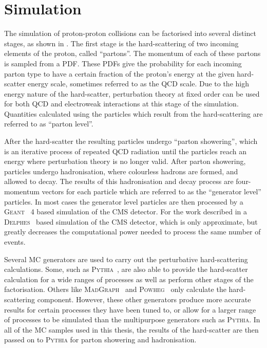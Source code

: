 \section{Simulation}
\label{sec:sim}
The simulation of \LHC proton-proton collisions can be factorised into several distinct stages, as shown in . The first stage is the hard-scattering of two incoming elements of the proton, called ``partons''. The momentum of each of these partons is sampled from a \ac{PDF}. These \ac{PDF}s give the probability for each incoming parton type to have a certain fraction of the proton's energy at the given hard-scatter energy scale, sometimes referred to as the \ac{QCD} scale. Due to the high energy nature of the hard-scatter, perturbation theory at fixed order can be used for both \ac{QCD} and electroweak interactions at this stage of the simulation. Quantities calculated using the particles which result from the hard-scattering are referred to as ``parton level''.

After the hard-scatter the resulting particles undergo ``parton showering'', which is an iterative process of repeated \ac{QCD} radiation until the particles reach an energy where perturbation theory is no longer valid. After parton showering, particles undergo hadronisation, where colourless hadrons are formed, and allowed to decay. The results of this hadronisation and decay process are four-momentum vectors for each particle which are referred to as the ``generator level'' particles. In most cases the generator level particles are then processed by a \textsc{Geant}~\cite{Agostinelli2003250} 4 based simulation of the CMS detector. For the work described in  a \textsc{Delphes}~\cite{Favereau2014} based simulation of the CMS detector, which is only approximate, but greatly decreases the computational power needed to process the same number of events.

Several \ac{MC} generators are used to carry out the perturbative hard-scattering calculations. Some, such as \textsc{Pythia}~\cite{Sjöstrand2008852}, are also able to provide the hard-scatter calculation for a wide ranges of processes as well as perform other stages of the factorisation. Others like \textsc{MadGraph}~\cite{Alwall2014} and \textsc{Powheg}~\cite{Nason:2004rx,Frixione:2007vw,Alioli:2010xd} only calculate the hard-scattering component. However, these other generators produce more accurate results for certain processes they have been tuned to, or allow for a larger range of processes to be simulated than the multipurpose generators such as \textsc{Pythia}. In all of the \ac{MC} samples used in this thesis, the results of the hard-scatter are then passed on to \textsc{Pythia} for parton showering and hadronisation.

